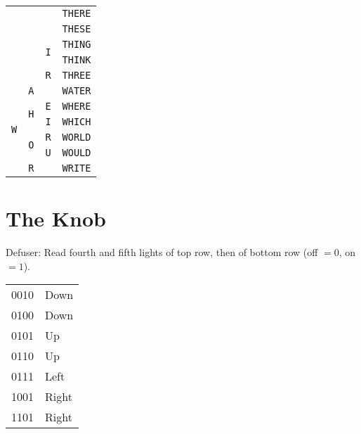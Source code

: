 \documentclass[11pt]{amsart}
\begin{document}
\begin{tabular}{|ccc|c|}
                            & & & \texttt{THERE} \\
                            & & & \texttt{THESE} \\
\cline{3-4}
                            &                             &
    \multirow{2}{*}{\texttt{I}} & \texttt{THING} \\
                            & & & \texttt{THINK} \\
\cline{3-4}
                            &                             &
    \texttt{R}                  & \texttt{THREE} \\
\hline
\multirow{6}{*}{\texttt{W}} & \texttt{A} & & \texttt{WATER} \\
\cline{2-4}
                            & \multirow{2}{*}{\texttt{H}} & \texttt{E} & \texttt{WHERE} \\
\cline{3-4}
                            &                             & \texttt{I} & \texttt{WHICH} \\
\cline{2-4}
                            & \multirow{2}{*}{\texttt{O}} & \texttt{R} & \texttt{WORLD} \\
\cline{3-4}
                            &                             & \texttt{U} & \texttt{WOULD} \\
\cline{2-4}
                            & \texttt{R} & & \texttt{WRITE} \\
\hline
\end{tabular}




\section{The Knob}

Defuser: Read fourth and fifth lights of top row, then of bottom row (off $=
0$, on $= 1$).

\begin{tabular}{|l|l|}
\hline
0010 & Down \\
0100 & Down \\
0101 & Up \\
0110 & Up \\
0111 & Left \\
1001 & Right \\
1101 & Right \\
\hline
\end{tabular}
\end{document}
